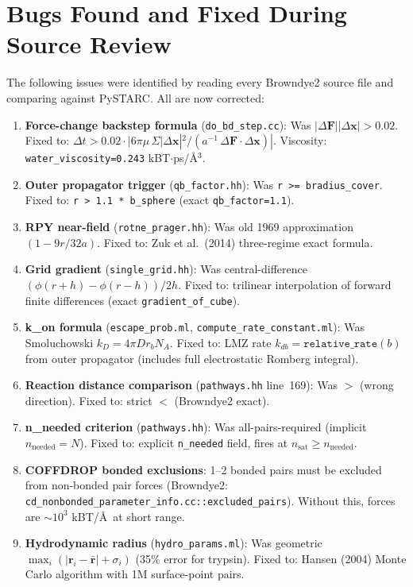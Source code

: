 \documentclass[12pt,a4paper]{article}
\begin{document}
\section{Bugs Found and Fixed During Source Review}

The following issues were identified by reading every Browndye2 source file
and comparing against PySTARC. All are now corrected:

\begin{enumerate}[nosep]
\item \textbf{Force-change backstep formula} (\texttt{do\_bd\_step.cc}):
  Was $|\Delta\mathbf{F}||\Delta\mathbf{x}|>0.02$.
  Fixed to: $\Delta t > 0.02 \cdot |6\pi\mu\,\Sigma|\Delta\mathbf{x}|^2 /
  (a^{-1}\,\Delta\mathbf{F}\cdot\Delta\mathbf{x})|$.
  Viscosity: \texttt{water\_viscosity=0.243} kBT$\cdot$ps/\AA$^3$.

\item \textbf{Outer propagator trigger} (\texttt{qb\_factor.hh}):
  Was \texttt{r >= bradius\_cover}.
  Fixed to: \texttt{r > 1.1 * b\_sphere} (exact \texttt{qb\_factor=1.1}).

\item \textbf{RPY near-field} (\texttt{rotne\_prager.hh}):
  Was old 1969 approximation $(1-9r/32a)$.
  Fixed to: Zuk et al.\ (2014) three-regime exact formula.

\item \textbf{Grid gradient} (\texttt{single\_grid.hh}):
  Was central-difference $(\phi(r+h)-\phi(r-h))/2h$.
  Fixed to: trilinear interpolation of forward finite differences
  (exact \texttt{gradient\_of\_cube}).

\item \textbf{k\_on formula} (\texttt{escape\_prob.ml}, \texttt{compute\_rate\_constant.ml}):
  Was Smoluchowski $k_D=4\pi D r_b N_A$.
  Fixed to: LMZ rate $k_{db}=\texttt{relative\_rate}(b)$ from outer propagator
  (includes full electrostatic Romberg integral).

\item \textbf{Reaction distance comparison} (\texttt{pathways.hh} line~169):
  Was $>$ (wrong direction).
  Fixed to: strict $<$ (Browndye2 exact).

\item \textbf{n\_needed criterion} (\texttt{pathways.hh}):
  Was all-pairs-required (implicit $n_\mathrm{needed}=N$).
  Fixed to: explicit \texttt{n\_needed} field, fires at $n_\mathrm{sat}\geq n_\mathrm{needed}$.
\item \textbf{COFFDROP bonded exclusions}: 1--2 bonded pairs must be
  excluded from non-bonded pair forces (Browndye2:
  \texttt{cd\_nonbonded\_parameter\_info.cc::excluded\_pairs}).
  Without this, forces are $\sim10^3$ kBT/\AA\ at short range.
\item \textbf{Hydrodynamic radius} (\texttt{hydro\_params.ml}):
  Was geometric $\max_i(|\mathbf{r}_i-\bar{\mathbf{r}}|+\sigma_i)$ (35\% error for trypsin).
  Fixed to: Hansen (2004) Monte Carlo algorithm with 1M surface-point pairs.
\end{enumerate}
\end{document}
